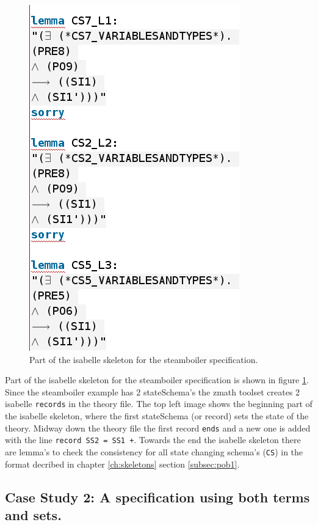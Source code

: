 \begin{figure}[H]
\begin{minipage}{0.53\textwidth}
\end{minipage}
\begin{minipage}{0.45\textwidth}
\centering
\includegraphics[scale=0.5]{Figures/Evaluation/4imagec.png}
\end{minipage}
\caption{Part of the isabelle skeleton for the steamboiler specification.\label{fig:steamisaskel}}
\end{figure}

Part of the isabelle skeleton for the steamboiler specification is shown in figure \ref{fig:steamisaskel}. Since the steamboiler example has 2 stateSchema's the \gls{zmath} toolset creates 2 isabelle 	\texttt{records} in the theory file. The top left image shows the beginning part of the isabelle skeleton, where the first stateSchema (or record) sets the state of the theory. Midway down the theory file the first record \texttt{ends} and a new one is added with the line \verb|record SS2 = SS1 +|. Towards the end the isabelle skeleton there are lemma's to check the consistency for all state changing schema's (\texttt{CS}) in the format decribed in chapter \ref{ch:skeletons} section \ref{subsec:pob1}.

\subsection{Case Study 2: A specification using both terms and sets.}

